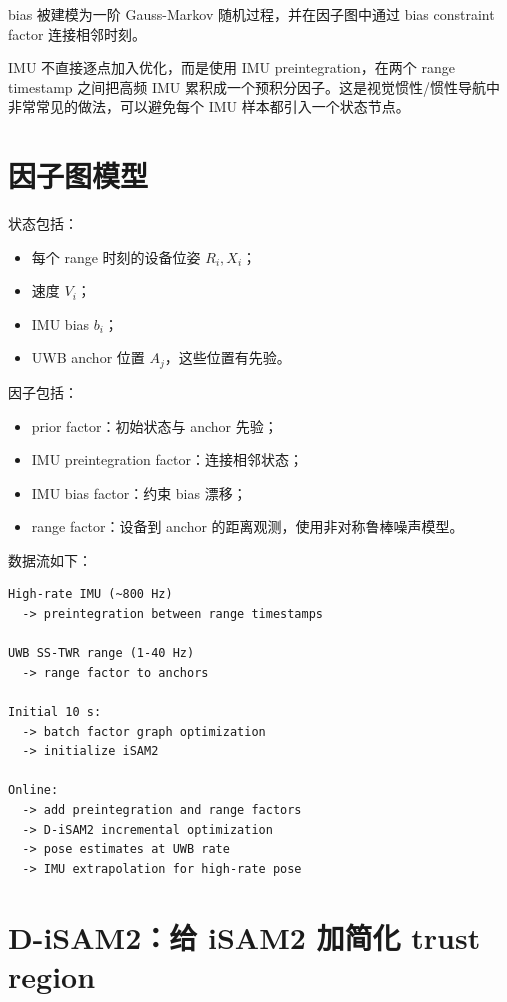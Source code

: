 \documentclass[UTF8,a4paper,12pt]{ctexrep}
\begin{document}
bias 被建模为一阶 Gauss-Markov 随机过程，并在因子图中通过 bias constraint factor 连接相邻时刻。

IMU 不直接逐点加入优化，而是使用 IMU preintegration，在两个 range timestamp 之间把高频 IMU 累积成一个预积分因子。这是视觉惯性/惯性导航中非常常见的做法，可以避免每个 IMU 样本都引入一个状态节点。

\section{因子图模型}

状态包括：

\begin{itemize}
  \item 每个 range 时刻的设备位姿 \(R_i,X_i\)；
  \item 速度 \(V_i\)；
  \item IMU bias \(b_i\)；
  \item UWB anchor 位置 \(A_j\)，这些位置有先验。
\end{itemize}

因子包括：

\begin{itemize}
  \item prior factor：初始状态与 anchor 先验；
  \item IMU preintegration factor：连接相邻状态；
  \item IMU bias factor：约束 bias 漂移；
  \item range factor：设备到 anchor 的距离观测，使用非对称鲁棒噪声模型。
\end{itemize}

数据流如下：

\begin{lstlisting}
High-rate IMU (~800 Hz)
  -> preintegration between range timestamps

UWB SS-TWR range (1-40 Hz)
  -> range factor to anchors

Initial 10 s:
  -> batch factor graph optimization
  -> initialize iSAM2

Online:
  -> add preintegration and range factors
  -> D-iSAM2 incremental optimization
  -> pose estimates at UWB rate
  -> IMU extrapolation for high-rate pose
\end{lstlisting}

\section{D-iSAM2：给 iSAM2 加简化 trust region}
\end{document}
